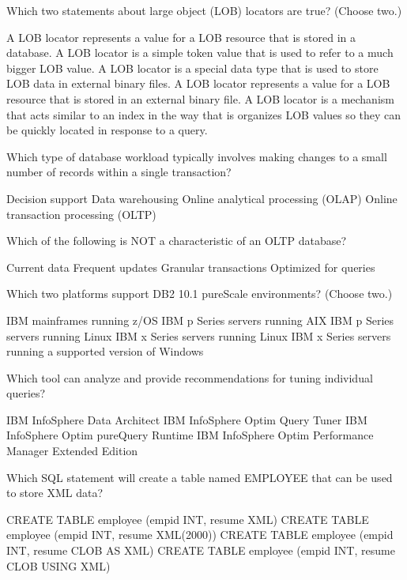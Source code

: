 \documentclass[answers, 11pt]{exam}
\begin{document}
\begin{questions}
\question[1]
Which two statements about large object (LOB) locators are true? (Choose two.)
\begin{choices}
\choice A LOB locator represents a value for a LOB resource that is stored in a database.
\choice A LOB locator is a simple token value that is used to refer to a much bigger LOB value.
\choice A LOB locator is a special data type that is used to store LOB data in external binary files.
\choice A LOB locator represents a value for a LOB resource that is stored in an external binary file.
\choice A LOB locator is a mechanism that acts similar to an index in the way that is organizes LOB values
		so they can be quickly located in response to a query.
\end{choices}

\question[1]
Which type of database workload typically involves making changes to a small number of records within
a single transaction?
\begin{choices}
\choice Decision support
\choice Data warehousing
\choice Online analytical processing (OLAP)
\choice Online transaction processing (OLTP)
\end{choices}

\question[1]
Which of the following is NOT a characteristic of an OLTP database?
\begin{choices}
\choice Current data
\choice Frequent updates
\choice Granular transactions
\choice Optimized for queries
\end{choices}

\question[1]
Which two platforms support DB2 10.1 pureScale environments? (Choose two.)
\begin{choices}
\choice IBM mainframes running z/OS
\choice IBM p Series servers running AIX
\choice IBM p Series servers running Linux
\choice IBM x Series servers running Linux
\choice IBM x Series servers running a supported version of Windows
\end{choices}

\newpage
\addpoints
\question[1]
Which tool can analyze and provide recommendations for tuning individual queries?
\begin{choices}
\choice IBM InfoSphere Data Architect
\choice IBM InfoSphere Optim Query Tuner
\choice IBM InfoSphere Optim pureQuery Runtime
\choice IBM InfoSphere Optim Performance Manager Extended Edition
\end{choices}

\question[1]
Which SQL statement will create a table named EMPLOYEE that can be used to store XML data?
\begin{choices}
\choice CREATE TABLE employee (empid INT, resume XML)
\choice CREATE TABLE employee (empid INT, resume XML(2000))
\choice CREATE TABLE employee (empid INT, resume CLOB AS XML)
\choice CREATE TABLE employee (empid INT, resume CLOB USING XML)
\end{choices}


\end{questions}
\end{document}
